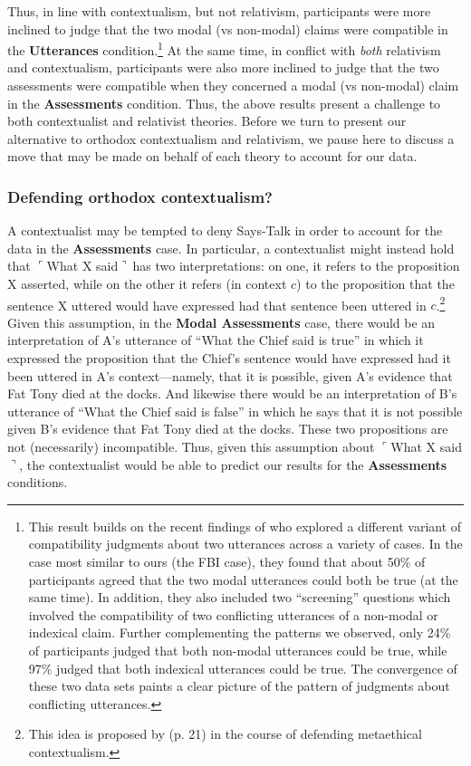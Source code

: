 \documentclass[11pt]{article}
\newcommand{\ul}{$\ulcorner$}
\newcommand{\ur}{$\urcorner\ $}
\newcommand{\urn}{$\urcorner$}
\begin{document}
\begin{doublespace}
Thus, in line with contextualism, but not relativism, participants were more inclined to judge that the two modal (vs non-modal) claims were compatible in the {\bf Utterances} condition.\footnote{This result builds on the recent findings of \cite{katz:2017} who explored a different variant of compatibility judgments about two  utterances across a variety of cases. In the case most similar to ours (the FBI case), they found that about 50\% of participants agreed that the two modal utterances could both be true (at the same time). In addition, they also included two ``screening'' questions which involved the compatibility of two conflicting utterances of a non-modal or indexical claim. Further complementing the patterns we observed, only 24\% of participants judged that both non-modal utterances could be true, while 97\% judged that both indexical utterances could be true. The convergence of these two data sets paints a clear picture of the pattern of judgments about conflicting utterances.} At the same time, in conflict with \textit{both} relativism and contextualism, participants were also more inclined to judge that the two assessments were compatible when they concerned a modal (vs non-modal) claim in the {\bf Assessments} condition. Thus, the above results present a challenge to both contextualist and relativist theories. Before we turn to present our  alternative to orthodox contextualism and relativism, we pause here to discuss a move that may be made on behalf of each theory to account for our data.

\subsubsection{Defending orthodox contextualism?}

A contextualist may be tempted to deny {\sc Says-Talk} in order to account for the data in the {\bf Assessments} case. In particular, a contextualist might instead hold that \ul What X said\ur has two interpretations: on one, it refers to the proposition X asserted, while on the other it refers (in context $c$) to the proposition that the sentence X uttered would have expressed had that sentence been uttered in $c$.\footnote{This idea is proposed by \cite{bjornsson:2010} (p. 21) in the course of defending metaethical contextualism.} Given this assumption, in the {\bf Modal Assessments} case, there would be an interpretation of A's utterance of ``What the Chief said is true'' in which it expressed the proposition that the Chief's sentence would have expressed had it been uttered in A's context---namely, that it is possible, given A's evidence that Fat Tony died at the docks. And likewise there would be an interpretation of B's utterance of ``What the Chief said is false'' in which he says that it is not possible given B's evidence that Fat Tony died at the docks. These two propositions are not (necessarily) incompatible. Thus, given this assumption about \ul What X said\urn, the contextualist would be able to predict our results for the {\bf Assessments} conditions.  


\end{doublespace}
\end{document}
